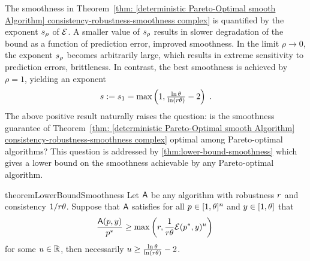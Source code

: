 The smoothness in Theorem~\ref{thm: [deterministic Pareto-Optimal smooth Algorithm] consistency-robustness-smoothness complex} is quantified by the exponent ${s_\rho}$ of $\mathcal{E}$.
A smaller value of ${s_\rho}$ results in slower degradation of the bound as a function of prediction error,  \ie improved smoothness. In the limit $\rho \to 0$, the exponent ${s_\rho}$ becomes arbitrarily large, which results in extreme sensitivity to prediction errors, \ie brittleness. 
In contrast, the best smoothness is achieved by $\rho = 1$, yielding an exponent
\[
s:=s_1=\max\left(1, \tfrac{\ln \theta}{ \ln (r \theta)} - 2\right)\;.
\]
The above positive result naturally raises the question: is the smoothness guarantee of Theorem~\ref{thm: [deterministic Pareto-Optimal smooth Algorithm] consistency-robustness-smoothness complex} optimal among Pareto-optimal algorithms?
This question is addressed by \cref{thm:lower-bound-smoothness} which gives a lower bound on the smoothness achievable by any Pareto-optimal algorithm. 


\begin{restatable}{theorem}{LowerBoundSmoothness}\label{thm:lower-bound-smoothness}
Let $\mbox{\textup{\textsf{A}}}$ be any algorithm with robustness $r$ and consistency $1/r \theta$. Suppose that $\mbox{\textup{\textsf{A}}}$ satisfies for all $p \in [1,\theta]^n$ and $y \in [1,\theta]$ that
\begin{equation}
\frac{\mbox{\textup{\textsf{A}}}(p, y)}{p^*} \geq 
\max\left(
r, \frac{1}{r \theta} \mathcal{E}(p^*,y)^{{u}}
\right)\;
\end{equation}
for some ${u} \in \mathbb{R}$, then necessarily ${u} \geq \tfrac{\ln \theta}{ \ln (r \theta)}-2$.
\end{restatable}



